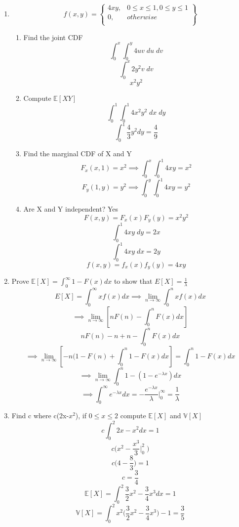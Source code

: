 \documentclass[letterpaper,12pt]{article}
\begin{document}
\begin{enumerate}
\item 
\[
	f(x,y)	= \left \{ \begin{array}{ll}
      4xy, & 0\leq x \leq 1, 0 \leq y \leq 1 \\
      0, & otherwise \\
	\end{array} \right \}
\]
\begin{enumerate}
\item Find the joint CDF
\[
	\int_{0}^{x}\int_{0}^{y} 4uv \; du \;dv
\]
\[
	\int_{0}^{x} 2y^2v \; dv
\]
\[
	 x^2 y^2
\]
\item Compute $\mathbb{E}[XY]$
\[
	\int_{0}^{1}\int_{0}^{1} 4x^2y^2\; dx\; dy
\]
\[
	\int_{0}^{1} \frac{4}{3} y^2 dy = 	\frac{4}{9}
\]
\item Find the marginal CDF of X and Y
\[
	F_x(x,1) = x^2 \implies \int_{0}^{x}\int_{0}^{1}4xy = x^2
\]
\[
	F_y(1,y) = y^2  \implies \int_{0}^{y}\int_{0}^{1}4xy = y^2 
\]
\item Are X and Y independent? Yes
\[
	F(x,y) = F_x(x)F_y(y) = x^2y^2
\]
\[
	\int_{0}^{1} 4xy \; dy = 2x
\]
\[
	\int_{0}^{1} 4xy \; dx = 2y
\]
\[
	f(x,y) = f_x(x)f_y(y) = 4xy
\]
\end{enumerate}

\item Prove $\mathbb{E}[X] = \int_{0}^{\infty} 1 - F(x)dx$ to show that $E[X] = \frac{1}{\lambda}$
\[
	E[X] = \int_{0}^{\infty} x f(x) dx \implies
	\lim_{n\to\infty} \int_{0}^{n} x f(x) dx
\]
\[
	\implies \lim_{n\to\infty} [nF(n) - \int_{0}^{n} F(x) dx]
\]
\[
	nF(n) - n + n - \int_{0}^{n} F(x) dx
\]
\[
	\implies \lim_{n\to\infty} [-n(1-F(n) + \int_{0}^{n} 1- F(x) dx] = \int_{0}^{n} 1- F(x) dx
\]
\[
	\implies \lim_{n\to\infty} \int_{0}^{n} 1- (1-e^{-\lambda x})dx
\]
\[
	\implies \int_{0}^{\infty} e^{-\lambda x} dx = -\frac{e^{-\lambda x}}{\lambda} \bigg |_{0}^{\infty} = \frac{1}{\lambda}
\]
\item Find c where c(2x-$x^2$), if {$0 \leq x \leq 2$} compute $\mathbb{E}[X]$ and $\mathbb{V}[X]$
\[
	c\int_{0}^{2}2x-x^2 dx = 1
\]
\[
	c\bigg(x^2 - \frac{x^3}{3} \bigg|_{0}^{2} \; \bigg)
\]
\[
	c\bigg(4 - \frac{8}{3}\bigg) = 1
\]
\[
	c = \frac{3}{4}
\]
\[
	\mathbb{E}[X] =  \int_{0}^{2} \frac{3}{2}x^2-\frac{3}{4}x^3 dx = 1
\]
\[
	\mathbb{V}[X] = \int_{0}^{2} x^2\bigg(\frac{3}{2}x^2-\frac{3}{4}x^3\bigg) - 1 = \frac{3}{5}
\]
\end{enumerate}
\end{document}
